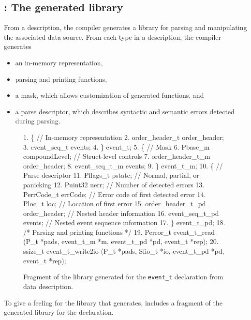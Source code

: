 \subsection{\pads{}: The generated library}
From a description, the \pads{} compiler generates a \C{} library
for parsing and manipulating the associated data source.  
From each type in a \pads{} description, the compiler generates 
\begin{itemize}
\setlength{\itemsep}{0ex plus0.2ex}
\item an in-memory representation, 
\item parsing and printing functions, 
\item a mask, which allows customization of generated functions, and
\item a parse descriptor, which describes syntactic and semantic errors detected during parsing.
\end{itemize}

\setcounter{totalnumber}{1}
\setcounter{dbltopnumber}{1}
\renewcommand{\topfraction}{0.85}
\renewcommand{\textfraction}{0.1}
\renewcommand{\floatpagefraction}{0.75}
\begin{figure*}
\begin{tiny}
\begin{code}
  1.   \{     // In-memory representation
  2.   order\_header\_t order\_header;
  3.   event\_seq\_t    events;
  4. \} event\_t;
 \mbox{}
  5.   \{     // Mask
  6.   Pbase\_m            compoundLevel;   // Struct-level controls
  7.   order\_header\_t\_m   order\_header;
  8.   event\_seq\_t\_m      events;
  9. \} event\_t\_m;
 \mbox{}
 10.   \{     // Parse descriptor
 11.   Pflags\_t   pstate;       // Normal, partial, or panicking 
 12.   Puint32    nerr;         // Number of detected errors
 13.   PerrCode\_t errCode;      // Error code of first detected error
 14.   Ploc\_t     loc;          // Location of first error
 15.   order\_header\_t\_pd order\_header;     // Nested header information
 16.   event\_seq\_t\_pd    events; // Nested event sequence information
 17. \} event\_t\_pd;
 \mbox{}
 18. /* Parsing and printing functions */
 19. Perror\_t event\_t\_read     (P\_t *pads, event\_t\_m *m, event\_t\_pd *pd, event\_t *rep);
 20. ssize\_t  event\_t\_write2io (P\_t *pads, Sfio\_t *io,   event\_t\_pd *pd, event\_t *rep);
\end{code}
\caption{Fragment of the library generated for the \texttt{event\_t}
  declaration from \dibbler{} data description.}
\label{figure:library}
\end{tiny}
\end{figure*}
To give a feeling for the library that \pads{} generates, 
 includes a fragment of the generated 
library for the \dibbler{}  declaration.

